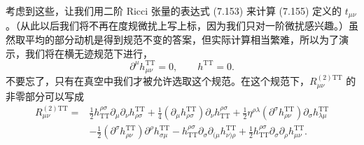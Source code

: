 考虑到这些，让我们用二阶 Ricci 张量的表达式 (7.153) 来计算 (7.155) 定义的 $t_{\mu\nu}$。（从此以后我们将不再在度规微扰上写上标，因为我们只对一阶微扰感兴趣。）虽然取平均的部分动机是得到规范不变的答案，但实际计算相当繁难，所以为了演示，我们将在横无迹规范下进行，
\begin{equation*}
\partial^{\mu}h^{\mathrm{TT}}_{\mu\nu} = 0, \qquad h^{\mathrm{TT}} = 0.
\tag{7.159}
\end{equation*}
不要忘了，只有在真空中我们才被允许选取这个规范。在这个规范下，$R^{(2)\mathrm{TT}}_{\mu\nu}$ 的非零部分可以写成
\begin{align*}
R^{(2)\mathrm{TT}}_{\mu\nu} ={}& \frac{1}{2}h^{\rho\sigma}_{\mathrm{TT}}\partial_\mu\partial_\nu h^{\mathrm{TT}}_{\rho\sigma} + \frac{1}{4}(\partial_\mu h^{\mathrm{TT}}_{\rho\sigma})\partial_\nu h^{\rho\sigma}_{\mathrm{TT}} + \frac{1}{2}\eta^{\rho\lambda}(\partial^\sigma h^{\mathrm{TT}}_{\rho\nu})\partial_\sigma h^{\mathrm{TT}}_{\lambda\mu} \\
&- \frac{1}{2}(\partial^\sigma h^{\mathrm{TT}}_{\rho\nu})\partial^\rho h^{\mathrm{TT}}_{\sigma\mu} - h^{\rho\sigma}_{\mathrm{TT}}\partial_\sigma\partial_{(\mu}h^{\mathrm{TT}}_{\nu)\rho} + \frac{1}{2}h^{\rho\sigma}_{\mathrm{TT}}\partial_\sigma\partial_\rho h^{\mathrm{TT}}_{\mu\nu}.
\tag{7.160}
\end{align*}


